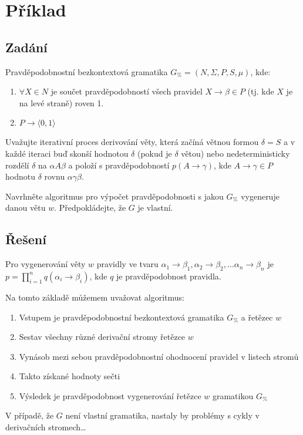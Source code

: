 \documentclass[11pt, a4paper]{article}
\begin{document}
\section{Příklad}
\subsection*{Zadání}
Pravděpodobnostní bezkontextová gramatika $G_\% = (N, \Sigma, P, S, \mu)$, kde:
\begin{enumerate}
	\item $\forall X \in N$ je součet pravděpodobností všech pravidel $X \rightarrow \beta \in P$ (tj. kde $X$ je na levé straně) roven 1.
	\item $P \rightarrow \langle 0, 1\rangle$
\end{enumerate}

\noindent Uvažujte iterativní proces derivování věty, která začíná větnou formou $\delta = S$ a v každé iteraci buď skonší hodnotou $\delta$ (pokud je $\delta$ větou) nebo nedeterministicky rozdělí $\delta$ na $\alpha A\beta$ a položí s pravděpodobností $p(A \rightarrow \gamma)$, kde $A \rightarrow \gamma \in P$ hodnotu $\delta$ rovnu $\alpha\gamma\beta$.

\noindent Navrhněte algoritmus pro výpočet pravděpodobnosti s jakou $G_\%$ vygeneruje danou větu $w$. Předpokládejte, že $G$ je vlastní.
\subsection*{Řešení}
Pro vygenerování věty $w$ pravidly ve tvaru $\alpha_1 \rightarrow \beta_1, \alpha_2 \rightarrow \beta_2,\ldots \alpha_n \rightarrow \beta_n$ je $ p = \prod\limits_{i=1}^n q(\alpha_i \rightarrow \beta_i)$, kde $q$ je pravděpodobnost pravidla.

\noindent Na tomto základě můžemem uvažovat algoritmus:
\begin{enumerate}
	\item Vstupem je pravděpodobnostní bezkontextová gramatika $G_\%$ a řetězec $w$
	\item Sestav všechny různé derivační stromy řetězce $w$
	\item Vynásob mezi sebou pravděpodobnostní ohodnocení pravidel v listech stromů
	\item Takto získané hodnoty sečti
	\item Výsledek je pravděpodobnost vygenerování řetězce $w$ gramatikou $G_\%$
\end{enumerate}

\noindent V případě, že $G$ není vlastní gramatika, nastaly by problémy s cykly v derivačních stromech\ldots
\end{document}
